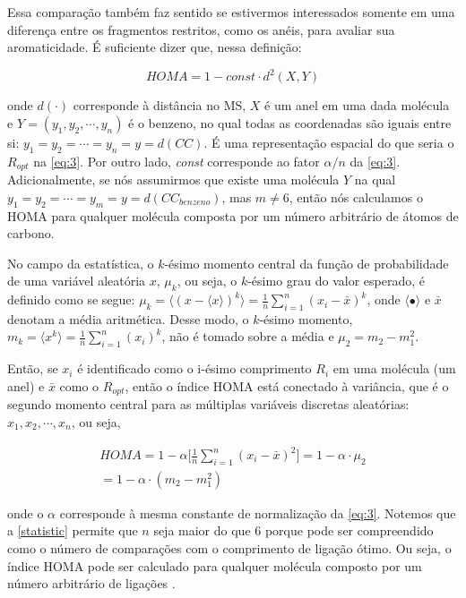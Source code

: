 Essa comparação também faz sentido se estivermos interessados somente em uma diferença entre os fragmentos restritos, como os anéis, para avaliar sua aromaticidade. É suficiente dizer que, nessa definição:

\begin{equation}
    HOMA = 1 - \textit{const} \cdot d^2(X, Y)
\end{equation}

\noindent onde $d(\cdot)$ corresponde à distância no \gls{MS}, $X$ é um anel em uma dada molécula e $Y = (y_1, y_2, \cdots, y_n)$ é o benzeno, no qual todas as coordenadas são iguais entre si: $y_1 = y_2 = \cdots = y_n = y = d(CC)$. É uma representação espacial do que seria o $R_{opt}$ na \autoref{eq:3}. Por outro lado, \textit{const} corresponde ao fator $\alpha / n$ da \autoref{eq:3}. Adicionalmente, se nós assumirmos que existe uma molécula $Y$ na qual $y_1 = y_2 = \cdots = y_m = y = d(CC_{benzeno})$, mas $m \neq 6$, então nós calculamos o \gls{HOMA} para qualquer molécula composta por um número arbitrário de átomos de carbono.

No campo da estatística, o $k$-ésimo momento central da função de probabilidade de uma variável aleatória $x$, $\mu_k$, ou seja, o $k$-ésimo grau do valor esperado, é definido como se segue: $\mu_k = \langle (x - \langle x \rangle)^k \rangle = \displaystyle \frac{1}{n} \sum_{i = 1}^n (x_i - \bar{x})^k$, onde $\langle \bullet \rangle$ e $\bar{x}$ denotam a média aritmética.
Desse modo, o $k$-ésimo momento, $m_k = \langle x^k \rangle = \displaystyle \frac{1}{n} \sum_{i=1}^n (x_i)^k$, não é tomado sobre a média e $\mu_2 = m_2 - m_1^2$.

Então, se $x_i$ é identificado como o i-ésimo comprimento $R_i$ em uma molécula (um anel) e $\bar{x}$ como o $R_{opt}$, então o índice \gls{HOMA} está conectado à variância, que é o segundo momento central para as múltiplas variáveis discretas aleatórias: $x_1, x_2, \cdots, x_n$, ou seja, 

\begin{equation}
\label{statistic}
\begin{split}
    HOMA = 1 - \alpha \bigg[\frac{1}{n} \sum_{i=1}^n (x_i - \bar{x})^2 \bigg] = 1 - \alpha \cdot \mu_2 \\ = 1 - \alpha \cdot (m_2 - m_1^2 )
\end{split}
\end{equation}

\noindent onde o $\alpha$ corresponde à mesma constante de normalização da \autoref{eq:3}. Notemos que a \autoref{statistic} permite que $n$ seja maior do que 6 porque pode ser compreendido como o número de comparações com o comprimento de ligação ótimo. Ou seja, o índice \gls{HOMA} pode ser calculado para qualquer molécula composto por um número arbitrário de ligações .

